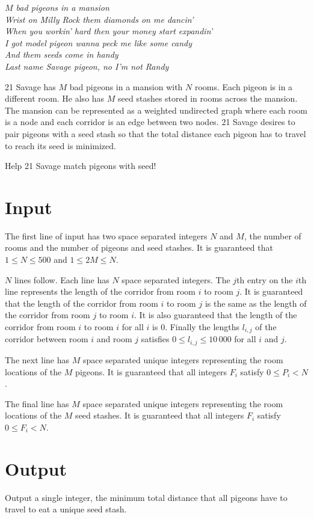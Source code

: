 
\begin{center}
\textit{
$M$ bad pigeons in a mansion \\
Wrist on Milly Rock them diamonds on me dancin' \\
When you workin' hard then your money start expandin' \\
I got model pigeon wanna peck me like some candy \\
And them seeds come in handy \\
Last name Savage pigeon, no I'm not Randy \\
}
\end{center}

21 Savage has $M$ bad pigeons in a mansion with $N$ rooms. Each pigeon
is in a different room. He also has $M$ seed stashes stored in rooms across
the mansion. The mansion can be represented as a weighted undirected graph
where each room is a node and each corridor is an edge between two nodes. 21
Savage desires to pair pigeons with a seed stash so that the total distance
each pigeon has to travel to reach its seed is minimized.

\medskip

Help 21 Savage match pigeons with seed!

\section*{Input}

The first line of input has two space separated integers $N$ and $M$, the
number of rooms and the number of pigeons and seed stashes. It is guaranteed
that $1 \le N \le 500$ and $1 \le 2M \le N$.

$N$ lines follow. Each line has $N$ space separated integers. The $j$th entry
on the $i$th line represents the length of the corridor from room $i$ to room
$j$. It is guaranteed that the length of the corridor from room $i$ to room
$j$ is the same as the length of the corridor from room $j$ to room $i$. It
is also guaranteed that the length of the corridor from room $i$ to room $i$
for all $i$ is $0$. Finally the lengths $l_{i,j}$ of the corridor between room
$i$ and room $j$ satisfies $0 \le l_{i,j} \le 10\,000$ for all $i$ and $j$.

The next line has $M$ space separated unique integers representing the room
locations of the $M$ pigeons. It is guaranteed that all integers $F_i$ satisfy
$0 \le P_i < N$.

The final line has $M$ space separated unique integers representing the room
locations of the $M$ seed stashes. It is guaranteed that all integers $F_i$ satisfy
$0 \le F_i < N$.

\section*{Output}

Output a single integer, the minimum total distance that all pigeons have to
travel to eat a unique seed stash.
